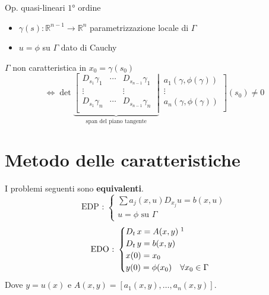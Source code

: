 Op. quasi-lineari $1$° ordine

\begin{itemize}
\item $\gamma (s): \mathbb{R}^{n-1}\rightarrow \mathbb{R}^n$ parametrizzazione locale di $\Gamma$
\item $u = \phi$ su $\Gamma$ dato di Cauchy
\end{itemize}

\begin{definition}
$\Gamma$ non caratteristica in $x_0=\gamma (s_0)$\\
\begin{equation*}
\iff \det
\underbrace{
\left[
\begin{matrix}
D_{s_1}\gamma_1 & \cdots & D_{s_{n-1}}\gamma_1 \\
\vdots &  & \vdots \\
D_{s_1}\gamma_n & \cdots & D_{s_{n-1}}\gamma_n \\
\end{matrix}\;\right|}_{\text{span del piano tangente}} \,
\left.
\begin{matrix}
a_1(\gamma, \phi(\gamma))\\
\vdots\\
a_n(\gamma, \phi(\gamma))\\
\end{matrix}\right] (s_0) \neq 0
\end{equation*}
\end{definition}

\newpage
\section{Metodo delle caratteristiche}
I problemi seguenti sono \textbf{equivalenti}.
\begin{equation} \label{edpquasilin}
\text{EDP : }
\begin{cases}
\sum a_j(x,u)D_{x_j} u = b(x,u)\\
u = \phi \text{ su } \Gamma
\end{cases} 
\end{equation}
\begin{equation}
\text{EDO : }
\begin{cases}
D_t \, x = A(x,y) \; \footnotemark \\
D_t \, y = b(x,y)\\ 
x(0)=x_0\\ 
y(0) = \phi (x_0) \quad \forall x_0 \in \Gamma
\end{cases} 
\end{equation}
Dove $y = u(x)$ e $A(x,y)=[a_1(x,y),\ldots ,a_n(x,y)]$.


